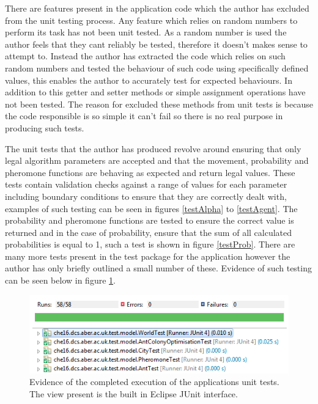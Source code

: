 There are features present in the application code which the author has excluded from the unit testing process. Any feature which relies on random numbers to perform its task has not been unit tested. As a random number is used the author feels that they cant reliably be tested, therefore it doesn’t makes sense to attempt to. Instead the author has extracted the code which relies on such random numbers and tested the behaviour of such code using specifically defined values, this enables the author to accurately test for expected behaviours. In addition to this getter and setter methods or simple assignment operations have not been tested. The reason for excluded these methods from unit tests is because the code responsible is so simple it can’t fail so there is no real purpose in producing such tests.

The unit tests that the author has produced revolve around ensuring that only legal algorithm parameters are accepted and that the movement, probability and pheromone functions are behaving as expected and return legal values. These tests contain validation checks against a range of values for each parameter including boundary conditions to ensure that they are correctly dealt with, examples of such testing can be seen in figures \ref{testAlpha} to \ref{testAgent}. The probability and pheromone functions are tested to ensure the correct value is returned and in the case of probability, ensure that the sum of all calculated probabilities is equal to 1, such a test is shown in figure \ref{testProb}. There are many more tests present in the test package for the application however the author has only briefly outlined a small number of these. Evidence of such testing can be seen below in figure \ref{testSS}.

\begin{figure}[H]
\centering
\includegraphics[scale=0.8]{Images/chapter6/testSS}
\caption{Evidence of the completed execution of the applications unit tests. The view present is the built in Eclipse JUnit interface.}
\label{testSS}
\end{figure}

